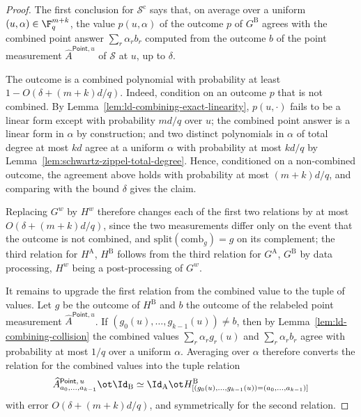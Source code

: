 \begin{proof}
	\leanok
	The first conclusion for $\mathcal S^{\mathrm c}$ says that, on average over
	a uniform $(u,\alpha) \in \F_q^{m+k}$, the value $p(u,\alpha)$ of the outcome
	$p$ of $G^{\mathrm B}$ agrees with the combined point answer
	$\sum_r \alpha_r b_r$ computed from the outcome $b$ of the point measurement
	$\widehat A^{\mathsf{Point},u}$ of $\mathcal S$ at $u$, up to $\delta$.

	The outcome is a combined polynomial with probability at least
	$1 - O(\delta + (m+k)d/q)$.  Indeed, condition on an outcome $p$ that is not
	combined.  By Lemma~\ref{lem:ld-combining-exact-linearity}, $p(u,\cdot)$ fails
	to be a linear form except with probability $md/q$ over $u$; the combined
	point answer is a linear form in $\alpha$ by construction; and two distinct
	polynomials in $\alpha$ of total degree at most $kd$ agree at a uniform
	$\alpha$ with probability at most $kd/q$ by
	Lemma~\ref{lem:schwartz-zippel-total-degree}.  Hence, conditioned on a
	non-combined outcome, the agreement above holds with probability at most
	$(m+k)d/q$, and comparing with the bound $\delta$ gives the claim.

	Replacing $G^w$ by $H^w$ therefore changes each of the first two relations by
	at most $O(\delta + (m+k)d/q)$, since the two measurements differ only on the
	event that the outcome is not combined, and
	$\mathrm{split}(\mathrm{comb}_g) = g$ on its complement; the third relation
	for $H^{\mathrm A}$, $H^{\mathrm B}$ follows from the third relation for
	$G^{\mathrm A}$, $G^{\mathrm B}$ by data processing, $H^w$ being a
	post-processing of $G^w$.

	It remains to upgrade the first relation from the combined value to the tuple
	of values.  Let $g$ be the outcome of $H^{\mathrm B}$ and $b$ the outcome of
	the relabeled point measurement $\widehat A^{\mathsf{Point},u}$.
	If $(g_0(u),\ldots,g_{k-1}(u)) \neq b$, then by
	Lemma~\ref{lem:ld-combining-collision} the combined values
	$\sum_r \alpha_r g_r(u)$ and $\sum_r \alpha_r b_r$ agree with probability at
	most $1/q$ over a uniform $\alpha$.  Averaging over $\alpha$ therefore
	converts the relation for the combined values into the tuple relation
	\[
		\widehat A^{\mathsf{Point},\,u}_{a_0,\ldots,a_{k-1}} \ot \Id_{\mathrm B}
		\simeq \Id_{\mathrm A} \ot
			H^{\mathrm B}_{[(g_0(u),\ldots,g_{k-1}(u)) =
				(a_0,\ldots,a_{k-1})]}
	\]
	with error $O(\delta + (m+k)d/q)$, and symmetrically for the second relation.
\end{proof}

